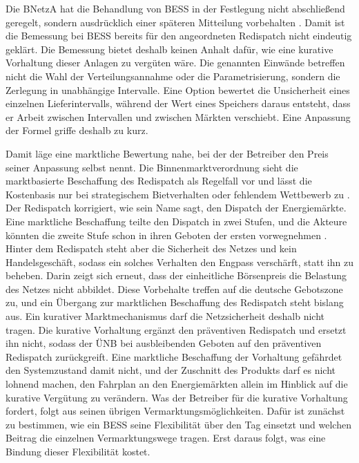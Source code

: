 Die \ac{BNetzA} hat die Behandlung von \ac{BESS} in der Festlegung nicht abschließend geregelt, sondern ausdrücklich einer späteren Mitteilung vorbehalten \cite{bundesnetzagentur_festlegung_2024}.
Damit ist die Bemessung bei \ac{BESS} bereits für den angeordneten Redispatch nicht eindeutig geklärt.
Die Bemessung bietet deshalb keinen Anhalt dafür, wie eine kurative Vorhaltung dieser Anlagen zu vergüten wäre.
Die genannten Einwände betreffen nicht die Wahl der Verteilungsannahme oder die Parametrisierung, sondern die Zerlegung in unabhängige Intervalle.
Eine Option bewertet die Unsicherheit eines einzelnen Lieferintervalls, während der Wert eines Speichers daraus entsteht, dass er Arbeit zwischen Intervallen und zwischen Märkten verschiebt.
Eine Anpassung der Formel griffe deshalb zu kurz.

Damit läge eine marktliche Bewertung nahe, bei der der Betreiber den Preis seiner Anpassung selbst nennt.
Die Binnenmarktverordnung sieht die marktbasierte Beschaffung des Redispatch als Regelfall vor und lässt die Kostenbasis nur bei strategischem Bietverhalten oder fehlendem Wettbewerb zu \cite{europaisches_parlament_und_rat_der_eu_verordnung_2019}.
Der Redispatch korrigiert, wie sein Name sagt, den Dispatch der Energiemärkte.
Eine marktliche Beschaffung teilte den Dispatch in zwei Stufen, und die Akteure könnten die zweite Stufe schon in ihren Geboten der ersten vorwegnehmen \cite{hirth_kosten_2019}.
Hinter dem Redispatch steht aber die Sicherheit des Netzes und kein Handelsgeschäft, sodass ein solches Verhalten den Engpass verschärft, statt ihn zu beheben.
Darin zeigt sich erneut, dass der einheitliche Börsenpreis die Belastung des Netzes nicht abbildet.
Diese Vorbehalte treffen auf die deutsche Gebotszone zu, und ein Übergang zur marktlichen Beschaffung des Redispatch steht bislang aus.
Ein kurativer Marktmechanismus darf die Netzsicherheit deshalb nicht tragen.
Die kurative Vorhaltung ergänzt den präventiven Redispatch und ersetzt ihn nicht, sodass der \ac{ÜNB} bei ausbleibenden Geboten auf den präventiven Redispatch zurückgreift.
Eine marktliche Beschaffung der Vorhaltung gefährdet den Systemzustand damit nicht, und der Zuschnitt des Produkts darf es nicht lohnend machen, den Fahrplan an den Energiemärkten allein im Hinblick auf die kurative Vergütung zu verändern.
Was der Betreiber für die kurative Vorhaltung fordert, folgt aus seinen übrigen Vermarktungsmöglichkeiten.
Dafür ist zunächst zu bestimmen, wie ein \ac{BESS} seine Flexibilität über den Tag einsetzt und welchen Beitrag die einzelnen Vermarktungswege tragen.
Erst daraus folgt, was eine Bindung dieser Flexibilität kostet.


